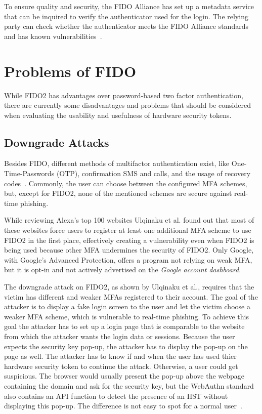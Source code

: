 \documentclass[runningheads]{llncs}
\begin{document}
To ensure quality and security, the FIDO Alliance has set up a metadata service that can be inquired to verify the authenticator used for the login. The relying party can check whether the authenticator meets the FIDO Alliance standards and has known vulnerabilities~\cite{9099190}.

\section{Problems of FIDO}
While FIDO2 has advantages over password-based two factor authentication, there are currently some disadvantages and problems that should be considered when evaluating the usability and usefulness of hardware security tokens.

\subsection{Downgrade Attacks}
Besides FIDO, different methods of multifactor authentication exist, like One-Time-Passwords (OTP), confirmation SMS and calls, and the usage of recovery codes~\cite{000004}. Commonly, the user can choose between the configured MFA schemes, but, except for FIDO2, none of the mentioned schemes are secure against real-time phishing. 

While reviewing Alexa's top 100 websites Ulqinaku et al. found out that most of these websites force users to register at least one additional MFA scheme to use FIDO2 in the first place, effectively creating a vulnerability even when FIDO2 is being used because other MFA undermines the security of FIDO2. Only Google, with Google's Advanced Protection, offers a program not relying on weak MFA, but it is opt-in and not actively advertised on the \textit{Google account dashboard}.

The downgrade attack on FIDO2, as shown by Ulqinaku et al., requires that the victim has different and weaker MFAs registered to their account. The goal of the attacker is to display a fake login screen to the user and let the victim choose a weaker MFA scheme, which is vulnerable to real-time phishing. To achieve this goal the attacker has to set up a login page that is comparable to the website from which the attacker wants the login data or sessions. Because the user expects the security key pop-up, the attacker has to display the pop-up on the page as well. The attacker has to know if and when the user has used thier hardware security token to continue the attack. Otherwise, a user could get suspicious. The browser would usually present the pop-up above the webpage containing the domain and ask for the security key, but the WebAuthn standard also contains an API function to detect the presence of an HST without displaying this pop-up. The difference is not easy to spot for a normal user~\cite{274610}.
\end{document}
